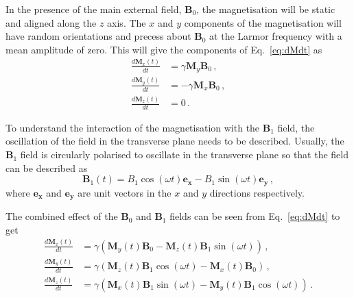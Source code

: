 In the presence of the main external field, $\mathbf{B}_0$, the magnetisation will be static and aligned along the $z$ axis. The $x$ and $y$ components of the magnetisation will have random orientations and precess about $\mathbf{B}_0$ at the Larmor frequency with a mean amplitude of zero. This will give the components of Eq.\ \ref{eq:dMdt} as\cite{DeGraaf2007}
\begin{align}
	\frac{d\mathbf{M}_x(t)}{dt} &= \gamma\mathbf{M}_y\mathbf{B}_0\,,\\
	\frac{d\mathbf{M}_y(t)}{dt} &= -\gamma\mathbf{M}_x\mathbf{B}_0\,,\\	\frac{d\mathbf{M}_z(t)}{dt} &= 0 \,.
\end{align}

To understand the interaction of the magnetisation with the $\mathbf{B}_1$ field, the oscillation of the field in the transverse plane needs to be described. 
%
Usually, the $\mathbf{B}_1$ field is circularly polarised to oscillate in the transverse plane so that the field can be described as
\begin{equation}
	\mathbf{B}_1(t) = B_1\cos(\omega t) \mathbf{e_x} - B_1\sin(\omega t) \mathbf{e_y}\,,
	\label{eq:circB1}
\end{equation}
where $\mathbf{e_x}$ and $\mathbf{e_y}$ are unit vectors in the $x$ and $y$ directions respectively. 


The combined effect of the $\mathbf{B}_0$ and $\mathbf{B}_1$ fields can be seen from Eq.\ \ref{eq:dMdt} to get \cite{DeGraaf2007}
\begin{align}
	\frac{d\mathbf{M}_x(t)}{dt} &= \gamma \left(\mathbf{M}_y(t)\mathbf{B}_0 - \mathbf{M}_z(t)\mathbf{B}_1\sin(\omega t)\right)\,,\label{eq:bloch_norelx}\\
	\frac{d\mathbf{M}_y(t)}{dt} &= \gamma \left(\mathbf{M}_z(t)\mathbf{B}_1\cos(\omega t) - \mathbf{M}_x(t)\mathbf{B}_0\right)\,,\label{eq:bloch_norely}\\
	\frac{d\mathbf{M}_z(t)}{dt} &= \gamma \left(\mathbf{M}_x(t)\mathbf{B}_1\sin(\omega t) - \mathbf{M}_y(t)\mathbf{B}_1\cos(\omega t) \right)\,.\label{eq:bloch_norelz}
\end{align}


